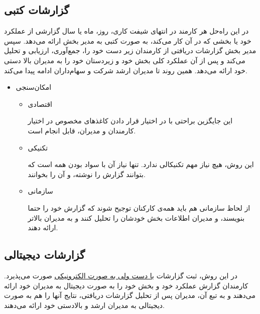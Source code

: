 \documentclass[12pt]{article}
\begin{document}
\subsection{گزارشات کتبی }\label{written-report}
در این راه‌حل هر کارمند در انتهای شیفت کاری، روز، ماه یا سال گزارشی از عملکرد خود یا بخشی که در آن کار می‌کند، به صورت کتبی به مدیر بخش ارائه می‌دهد. سپس مدیر بخش گزارشات دریافتی از کارمندان زیر دست خود را، جمع‌آوری، ارزیابی و تحلیل می‌کند و پس از آن عملکرد کلی بخش خود و زیردستان خود را به مدیران بالا دستی خود ارائه می‌دهد.
همین روند تا مدیران ارشد شرکت و سهام‌داران ادامه پیدا می‌کند.

\begin{itemize}
    \item امکان‌سنجی
    
    \begin{itemize}
        \item 
        اقتصادی
        
        این جایگزین براحتی با در اختیار قرار دادن کاغذ‌های مخصوص در اختیار کارمندان و مدیران، قابل انجام است.
        \item 
        تکنیکی
        
        این روش، هیچ نیاز مهم تکنیکالی ندارد. تنها نیاز آن با سواد بودن همه است که بتوانند گزارش را نوشته، و آن را بخوانند.
        \item 
        سازمانی
        
        از لحاظ سازمانی هم باید همه‌ی کارکنان توجیح شوند که گزارش خود را حتما بنویسند، و مدیران اطلاعات بخش خودشان را تحلیل کنند و به مدیران بالاتر ارائه دهند.
    \end{itemize}
\end{itemize}
\subsection{گزارشات دیجیتالی }\label{half-digital}
در این روش، ثبت گزارشات \underline{با دست ولی به صورت الکترونیکی} صورت می‌پذیرد.
کارمندان گزارش عملکرد خود و بخش خود را به صورت دیجیتال به مدیران خود ارائه می‌دهند و به تبع آن، مدیران پس از تحلیل گزارشات دریافتی، نتایج آنها را هم به صورت دیجیتالی به مدیران ارشد و بالادستی خود ارائه می‌دهند.
\end{document}
